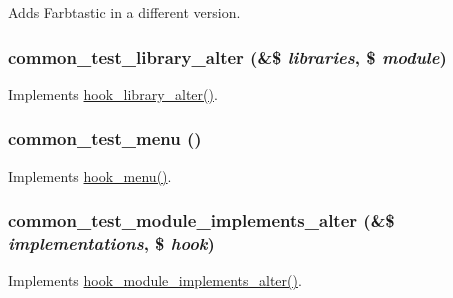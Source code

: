 Adds Farbtastic in a different version. \hypertarget{common__test_8module_a1063219ba57ea27906b1b9e7dee501da}{
\subsubsection[{common\_\-test\_\-library\_\-alter}]{\setlength{\rightskip}{0pt plus 5cm}common\_\-test\_\-library\_\-alter (\&\$ {\em libraries}, \/  \$ {\em module})}}
\label{common__test_8module_a1063219ba57ea27906b1b9e7dee501da}
Implements \hyperlink{group__hooks_ga7256c50068666c9c02f43a08efcefae7}{hook\_\-library\_\-alter()}. \hypertarget{common__test_8module_a2e80428c43d4fa90cb01e1bfa223d98c}{
\subsubsection[{common\_\-test\_\-menu}]{\setlength{\rightskip}{0pt plus 5cm}common\_\-test\_\-menu ()}}
\label{common__test_8module_a2e80428c43d4fa90cb01e1bfa223d98c}
Implements \hyperlink{group__hooks_ga5c95244fea59b25666e409759e133ded}{hook\_\-menu()}. \hypertarget{common__test_8module_a4a6004807e1f754a0f9680cba92689b9}{
\subsubsection[{common\_\-test\_\-module\_\-implements\_\-alter}]{\setlength{\rightskip}{0pt plus 5cm}common\_\-test\_\-module\_\-implements\_\-alter (\&\$ {\em implementations}, \/  \$ {\em hook})}}
\label{common__test_8module_a4a6004807e1f754a0f9680cba92689b9}
Implements \hyperlink{group__hooks_gab71c322e6487a3b99bd04c5b9adb13f6}{hook\_\-module\_\-implements\_\-alter()}.


